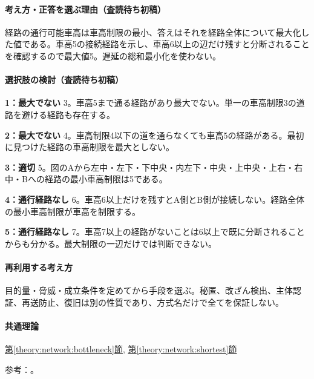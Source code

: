 \paragraph{考え方・正答を選ぶ理由（査読待ち初稿）} 経路の通行可能車高は車高制限の最小、答えはそれを経路全体について最大化した値である。車高5の接続経路を示し、車高6以上の辺だけ残すと分断されることを確認するので最大値5。遅延の総和最小化を使わない。

\paragraph{選択肢の検討（査読待ち初稿）}\mbox{}\par

\noindent\textbf{1：最大でない} 3。車高5まで通る経路があり最大でない。単一の車高制限3の道路を避ける経路も存在する。\par

\noindent\textbf{2：最大でない} 4。車高制限4以下の道を通らなくても車高5の経路がある。最初に見つけた経路の車高制限を最大としない。\par

\noindent\textbf{3：適切} 5。図のAから左中・左下・下中央・内左下・中央・上中央・上右・右中・Bへの経路の最小車高制限は5である。\par

\noindent\textbf{4：通行経路なし} 6。車高6以上だけを残すとA側とB側が接続しない。経路全体の最小車高制限が車高を制限する。\par

\noindent\textbf{5：通行経路なし} 7。車高7以上の経路がないことは6以上で既に分断されることからも分かる。最大制限の一辺だけでは判断できない。\par

\paragraph{再利用する考え方} 目的量・脅威・成立条件を定めてから手段を選ぶ。秘匿、改ざん検出、主体認証、再送防止、復旧は別の性質であり、方式名だけで全てを保証しない。

\paragraph{共通理論} \hyperref[theory:network:bottleneck]{第\ref*{theory:network:bottleneck}節}, \hyperref[theory:network:shortest]{第\ref*{theory:network:shortest}節}

\par 参考：\cite{net_dijkstra}。

